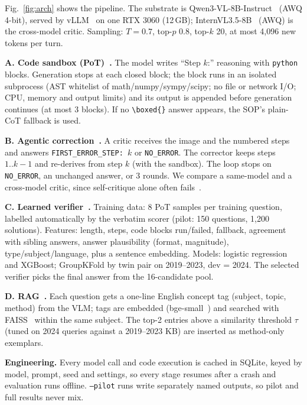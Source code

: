 \documentclass[conference]{IEEEtran}
\begin{document}
Fig.~\ref{fig:arch} shows the pipeline. The substrate is
Qwen3-VL-8B-Instruct~\cite{qwen3vl} (AWQ 4-bit), served by vLLM~\cite{vllm} on one RTX 3060
(12\,GB); InternVL3.5-8B~\cite{internvl35} (AWQ) is the cross-model critic. Sampling:
$T{=}0.7$, top-$p$ 0.8, top-$k$ 20, at most 4{,}096 new tokens per turn.

\textbf{A. Code sandbox (PoT)~\cite{pot,pal}.} The model writes ``Step $k$:'' reasoning with
\texttt{python} blocks. Generation stops at each closed block; the block runs in an isolated
subprocess (AST whitelist of math/numpy/sympy/scipy; no file or network I/O; CPU, memory and
output limits) and its output is appended before generation continues (at most 3 blocks). If no
\verb|\boxed{}| answer appears, the SOP's plain-CoT fallback is used.

\textbf{B. Agentic correction~\cite{selfrefine,critic}.} A critic receives the image and the
numbered steps and answers \texttt{FIRST\_ERROR\_STEP:~$k$} or \texttt{NO\_ERROR}. The corrector
keeps steps $1..k{-}1$ and re-derives from step $k$ (with the sandbox). The loop stops on
\texttt{NO\_ERROR}, an unchanged answer, or 3 rounds. We compare a same-model and a cross-model
critic, since self-critique alone often fails~\cite{cannotselfcorrect}.

\textbf{C. Learned verifier~\cite{cobbe,lightman}.} Training data: 8 PoT samples per training
question, labelled automatically by the verbatim scorer (pilot: 150 questions, 1{,}200
solutions). Features: length, steps, code blocks run/failed, fallback, agreement with sibling
answers, answer plausibility (format, magnitude), type/subject/language, plus a sentence
embedding. Models: logistic regression and XGBoost; GroupKFold by twin pair on 2019--2023, dev =
2024. The selected verifier picks the final answer from the 16-candidate pool.

\textbf{D. RAG~\cite{rag}.} Each question gets a one-line English concept tag (subject, topic,
method) from the VLM; tags are embedded (bge-small~\cite{bge}) and searched with
FAISS~\cite{faiss} within the same subject. The top-2 entries above a similarity threshold
$\tau$ (tuned on 2024 queries against a 2019--2023 KB) are inserted as method-only exemplars.

\textbf{Engineering.} Every model call and code execution is cached in SQLite, keyed by model,
prompt, seed and settings, so every stage resumes after a crash and evaluation runs offline.
\texttt{--pilot} runs write separately named outputs, so pilot and full results never mix.
\end{document}
